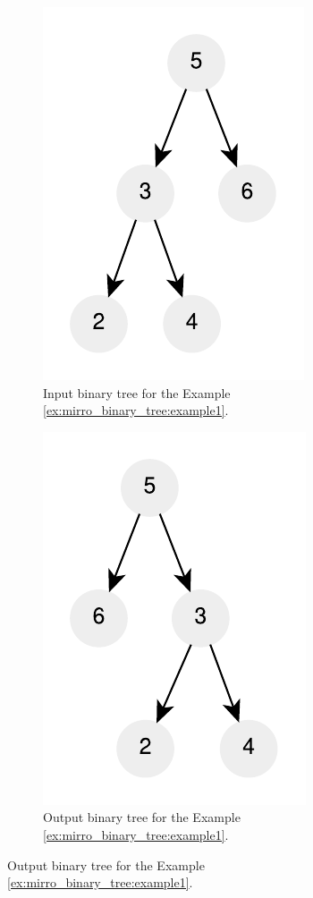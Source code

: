 \begin{figure}
	\centering
	\begin{subfigure}[b]{0.25\textwidth}
	   \includegraphics[]{sources/mirror_binary_tree/images/example1}
	   \caption{Input binary tree for the Example \ref{ex:mirro_binary_tree:example1}.}
	   \label{fig:mirro_binary_tree:example1}
	\end{subfigure}
	\hfill
	\begin{subfigure}[b]{0.4\textwidth}
	   \includegraphics[]{sources/mirror_binary_tree/images/example1_1}
	   \caption{Output binary tree for the Example \ref{ex:mirro_binary_tree:example1}.}

\end{subfigure}
\end{figure}
